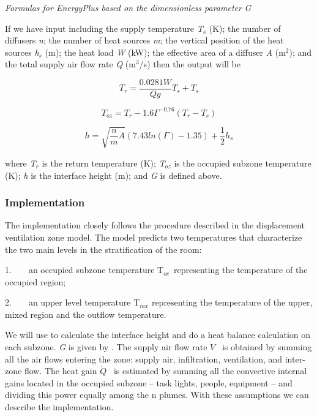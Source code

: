 \emph{Formulas for EnergyPlus based on the dimensionless parameter} \emph{G}

If we have input including the supply temperature \emph{T\(_{s}\)} (K); the number of diffusers \emph{n}; the number of heat sources \emph{m}; the vertical position of the heat sources \emph{h\(_{s}\)} (m); the heat load \emph{W} (kW); the effective area of a diffuser \emph{A} (m\(^{2}\)); and the total supply air flow rate \emph{Q} (m\(^{3}\)/s) then the output will be

\begin{equation}
{T_r} = \frac{{0.0281W}}{{Qg}}{T_s} + {T_s}
\end{equation}

\begin{equation}
{T_{oz}} = {T_r} - 1.6{\Gamma ^{ - 0.76}}({T_r} - {T_s})
\end{equation}

\begin{equation}
h = \sqrt {\frac{n}{m}A} (7.43ln(\Gamma ) - 1.35) + \frac{1}{2}{h_s}
\end{equation}

where \emph{T\(_{r}\)} is the return temperature (K); \emph{T\(_{oz}\)} is the occupied subzone temperature (K); \emph{h} is the interface height (m); and \emph{G} is defined above.

\subsubsection{Implementation}\label{implementation-1}

The implementation closely follows the procedure described in the displacement ventilation zone model. The model predicts two temperatures that characterize the two main levels in the stratification of the room:

1.~~~~an occupied subzone temperature T\(_{oc}\)~representing the temperature of the occupied region;

2.~~~~an upper level temperature T\(_{mx}\) representing the temperature of the upper, mixed region and the outflow temperature.

We will use to calculate the interface height and do a heat balance calculation on each subzone. \emph{G} is given by . The supply air flow rate \(\dot V\) ~is obtained by summing all the air flows entering the zone: supply air, infiltration, ventilation, and inter-zone flow. The heat gain \(\dot Q\) ~is estimated by summing all the convective internal gains located in the occupied subzone -- task lights, people, equipment -- and dividing this power equally among the n plumes. With these assumptions we can describe the implementation.

